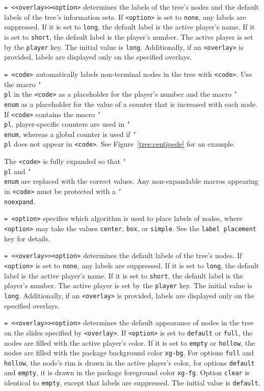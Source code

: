 \documentclass{article}
\newenvironment{desc}{\itemize[leftmargin=50pt]}{\enditemize}
\def\option#1#2{\item[\texttt{#1}] \hskip-1.5pt\texttt{#2}}
\renewcommand{\textbackslash}{\char`\\}
\def\cmd#1{\texttt{\color{cmd}\textbackslash#1}}
\begin{document}
\begin{desc}
\option{labels}{= <<overlay>><option>} determines the labels of the tree's nodes and the default labels of the tree's information sets. If \texttt{<option>} is set to \texttt{none}, any labels are suppressed. If it is set to \texttt{long}, the default label is the active player's name. If it is set to \texttt{short}, the default label is the player's number. The active player is set by the \texttt{player} key. The initial value is \texttt{long}. Additionally, if an \texttt{<overlay>} is provided, labels are displayed only on the specified overlays.

\option{node autolabel}{= <code>} automatically labels non-terminal nodes in the tree with \texttt{<code>}. Use the macro \cmd{pl} in the \texttt{<code>} as a placeholder for the player's number and the macro \cmd{enum} as a placeholder for the value of a counter that is increased with each node. If \texttt{<code>} contains the macro \cmd{pl}, player-specific counters are used in \cmd{enum}, whereas a global counter is used if \cmd{pl} does not appear in \texttt{<code>}. See Figure~\ref{tree:centipede} for an example.

{\color{player4}The \texttt{<code>} is fully expanded so that \cmd{pl} and \cmd{enum} are replaced with the correct values. Any non-expandable macros appearing in \texttt{<code>} must be protected with a \cmd{noexpand}.}

\option{node label placement}{= <option>} specifies which algorithm is used to place labels of nodes, where \texttt{<option>} may take the values \texttt{center}, \texttt{box}, or \texttt{simple}. See the \texttt{label placement} key for details.

\option{node labels}{= <<overlay>><option>} determines the default labels of the tree's nodes. If \texttt{<option>} is set to \texttt{none}, any labels are suppressed. If it is set to \texttt{long}, the default label is the active player's name. If it is set to \texttt{short}, the default label is the player's number. The active player is set by the \texttt{player} key. The initial value is \texttt{long}. Additionally, if an \texttt{<overlay>} is provided, labels are displayed only on the specified overlays.

\option{nodes}{= <<overlay>><option>} determines the default appearance of nodes in the tree on the slides specified by \texttt{<overlay>}. If \texttt{<option>} is set to \texttt{default} or \texttt{full}, the nodes are filled with the active player's color. If it is set to \texttt{empty} or \texttt{hollow}, the nodes are filled with the package background color \texttt{xg-bg}. For options \texttt{full} and \texttt{hollow}, the node's rim is drawn in the active player's color, for options \texttt{default} and \texttt{empty}, it is drawn in the package foreground color \texttt{xg-fg}. Option \texttt{clear} is identical to \texttt{empty}, except that labels are suppressed. The initial value is \texttt{default}. 


\end{desc}
\end{document}
